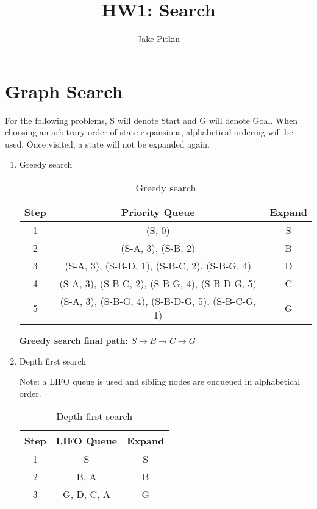 \documentclass[fleqn]{hermans-hw}
\title{HW1: Search}
\institute{University of Utah}
\author{Jake Pitkin}
\begin{document}
\maketitle
\section{Graph Search}

For the following problems, S will denote Start and G will denote Goal. When choosing an arbitrary order of state expansions, alphabetical ordering will be used. Once visited, a state will not be expanded again.

\begin{enumerate}
\item Greedy search
\begin{table}[H]
\centering
{\renewcommand{\arraystretch}{1.2}%
\begin{tabular}{| c | c | c |}
\hline
\textbf{Step} & \textbf{Priority Queue} & \textbf{Expand}\\
\hline
1 & (S, 0) & S\\ \hline
2 & (S-A, 3), (S-B, 2) & B\\ \hline
3 & (S-A, 3), (S-B-D, 1), (S-B-C, 2), (S-B-G, 4) & D\\ \hline
4 & (S-A, 3), (S-B-C, 2), (S-B-G, 4), (S-B-D-G, 5) & C\\ \hline
5 & (S-A, 3), (S-B-G, 4), (S-B-D-G, 5), (S-B-C-G, 1) & G\\ \hline
\end{tabular}}
\caption{Greedy search}
\end{table}

\textbf{Greedy search final path: $S \rightarrow B \rightarrow C \rightarrow G$}

\item Depth first search
 
Note: a LIFO queue is used and sibling nodes are enqueued in alphabetical order.

\begin{table}[H]
\centering
{\renewcommand{\arraystretch}{1.2}%
\begin{tabular}{| c | c | c |}
\hline
\textbf{Step} & \textbf{LIFO Queue} & \textbf{Expand}\\
\hline
1 & S & S\\ \hline
2 & B, A & B\\ \hline
3 & G, D, C, A & G\\ \hline
\end{tabular}}
\caption{Depth first search}
\end{table}


\end{enumerate}
\end{document}
